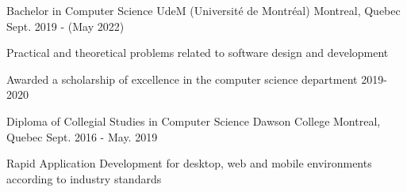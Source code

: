 

\begin{cventries}

  \cventry
    {Bachelor in Computer Science} %
    {UdeM (Université de Montréal)} %
    {Montreal, Quebec} %
    {Sept. 2019 - (May 2022)} %
    {
      \begin{cvitems} %
        \item {Practical and theoretical problems related to software design and development}
        \item {Awarded a scholarship of excellence in the computer science department 2019-2020}
      \end{cvitems}
    }
  \cventry
    {Diploma of Collegial Studies in Computer Science} %
    {Dawson College} %
    {Montreal, Quebec} %
    {Sept. 2016 - May. 2019} %
    {
      \begin{cvitems} %
        \item {Rapid Application Development for desktop, web and mobile environments according to industry standards}
      \end{cvitems}
    }

\end{cventries}
